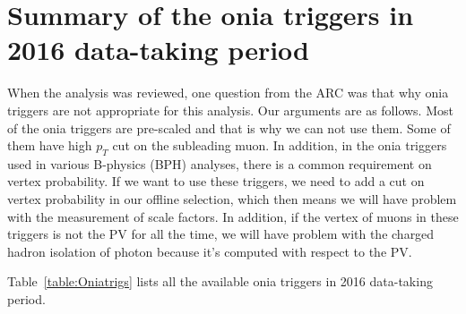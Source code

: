 \chapter{Summary of the onia triggers in 2016 data-taking period}
\label{sec:Oniatrig}
When the analysis was reviewed, one question from the ARC was that why onia triggers are not appropriate for this analysis. Our arguments are as follows. 
Most of the onia triggers are pre-scaled and that is why we can not use them. Some of them have high $p_{T}$ cut on the subleading muon. In addition, in the onia triggers used in various B-physics (BPH) analyses, there is a common requirement  on vertex probability. If we want to use these triggers, we need to add a cut on vertex probability in our offline selection, which then means we will have problem with the measurement of scale factors. In addition, if the vertex of muons in these triggers is not the PV for all the time, we will have problem with the charged hadron isolation of photon because it’s computed with respect to the PV.

Table~\ref{table:Oniatrigs} lists all the available onia triggers in 2016 data-taking period. 

